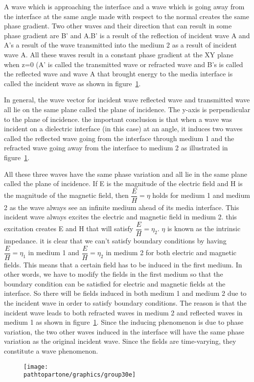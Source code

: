 A wave which is approaching the interface and a wave which is going away from the interface at the same angle made with respect to the normal creates the same phase gradient. Two other waves and their direction that can result in some phase gradient are B'
and A.B' is a result of the reflection of incident wave A and A's a result of the wave transmitted into the medium 2 as a result of incident wave A. All these waves result in a constant phase gradient at the XY plane when z=0 (A' is called the transmitted wave or refracted wave and B's is called the reflected wave and wave A that brought energy to the media interface is called the incident wave as shown in figure~\ref{fig:group30e}.

In general, the wave vector for incident wave reflected wave and transmitted wave all lie on the same plane called the plane of incidence. The y-axis is perpendicular to the plane of incidence. the important conclusion is that when a wave was incident on a dielectric interface (in this case) at an angle, it induces two waves called the reflected wave going from the interface through medium 1  and the refracted wave going away from the interface to medium 2 as illustrated in figure~\ref{fig:group30e}.

All these three waves have the same phase variation and all lie in the same plane called the plane of incidence. If E is the magnitude of the electric field and H is the magnitude of the magnetic field, then $\dfrac{E}{H}=\eta$ holds for medium 1 and medium 2 as the wave always see an infinite medium ahead of its media interface. This incident wave always excites the electric and magnetic field in medium 2. this excitation creates E and H that will satisfy $\dfrac{E}{H}=\eta_2$. $\eta$ is known as the intrinsic impedance. it is clear that we can't satisfy boundary conditions by having $\dfrac{E}{H}=\eta_1$ in medium 1 and $\dfrac{E}{H}=\eta_2$ in medium 2 for both electric and magnetic fields. This means that a certain field has to be induced in the first medium. In other words, we have to modify the fields in the first medium so that the boundary condition can be satisfied for electric and magnetic fields at the interface. So there will be fields induced in both medium 1 and medium 2 due to the incident wave in order to satisfy boundary conditions. The reason is that the incident wave leads to both refracted waves in medium 2 and reflected waves in medium 1 as shown in figure~\ref{fig:group30e}. Since the inducing phenomenon is due to phase variation, the two other waves induced in the interface will have the same phase variation as the original incident wave. Since the fields are time-varying, they constitute a wave phenomenon.
\begin{figure}[h]
\centering
\texttt{[image: \\pathtopartone/graphics/group30e]}
\caption{}
\label{fig:group30e}
\end{figure}

